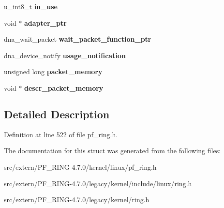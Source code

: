 \begin{DoxyCompactItemize}
\item 
\hypertarget{structdna__device_ab7335c6f289de2f5ba576871dbdb866f}{
u\_\-int8\_\-t {\bfseries in\_\-use}}
\label{structdna__device_ab7335c6f289de2f5ba576871dbdb866f}

\item 
\hypertarget{structdna__device_af7857b73ff8f7dbba19964607ead7e3a}{
void $\ast$ {\bfseries adapter\_\-ptr}}
\label{structdna__device_af7857b73ff8f7dbba19964607ead7e3a}

\item 
\hypertarget{structdna__device_af39190aa979f4a152a8e83d017a8b124}{
dna\_\-wait\_\-packet {\bfseries wait\_\-packet\_\-function\_\-ptr}}
\label{structdna__device_af39190aa979f4a152a8e83d017a8b124}

\item 
\hypertarget{structdna__device_a6b9d9f5e37b45985695bca35b684dac4}{
dna\_\-device\_\-notify {\bfseries usage\_\-notification}}
\label{structdna__device_a6b9d9f5e37b45985695bca35b684dac4}

\item 
\hypertarget{structdna__device_a531c8d29a91aa09087ab1b5963394787}{
unsigned long {\bfseries packet\_\-memory}}
\label{structdna__device_a531c8d29a91aa09087ab1b5963394787}

\item 
\hypertarget{structdna__device_a4622f48403356db58baee07df52873de}{
void $\ast$ {\bfseries descr\_\-packet\_\-memory}}
\label{structdna__device_a4622f48403356db58baee07df52873de}

\end{DoxyCompactItemize}


\subsection{Detailed Description}


Definition at line 522 of file pf\_\-ring.h.



The documentation for this struct was generated from the following files:\begin{DoxyCompactItemize}
\item 
src/extern/PF\_\-RING-\/4.7.0/kernel/linux/pf\_\-ring.h\item 
src/extern/PF\_\-RING-\/4.7.0/legacy/kernel/include/linux/ring.h\item 
src/extern/PF\_\-RING-\/4.7.0/legacy/kernel/ring.h\end{DoxyCompactItemize}

